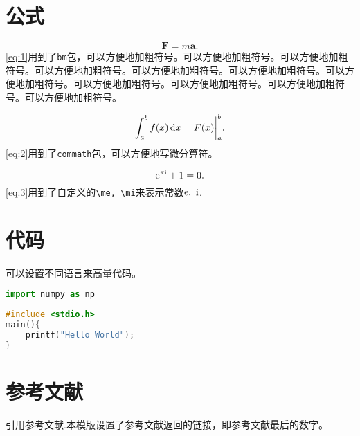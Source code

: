 \section{公式}


\begin{equation}
    \bm{F} = m\bm{a}.
    \label{eq:1}
\end{equation}
\cref{eq:1}用到了\texttt{bm}包，可以方便地加粗符号。可以方便地加粗符号。可以方便地加粗符号。可以方便地加粗符号。可以方便地加粗符号。可以方便地加粗符号。可以方便地加粗符号。可以方便地加粗符号。可以方便地加粗符号。可以方便地加粗符号。可以方便地加粗符号。

\begin{equation}
    \int^b_a f(x) \dif x=F(x)\bigg|^b_a.
    \label{eq:2}
\end{equation}
\cref{eq:2}用到了\texttt{commath}包，可以方便地写微分算符。

\begin{equation}
    \mathrm{e} ^{\pi \mathrm{i}} + 1 = 0.
    \label{eq:3}
\end{equation}
\cref{eq:3}用到了自定义的\verb"\me, \mi"来表示常数$\mathrm{e},\ \mathrm{i}$.

\section{代码}

可以设置不同语言来高量代码。

\begin{lstlisting}[language=python]
import numpy as np
\end{lstlisting}

\begin{lstlisting}[language=c]
#include <stdio.h>
main(){
    printf("Hello World");
}
\end{lstlisting}

\section{参考文献}

引用参考文献.本模版设置了参考文献返回的链接，即参考文献最后的数字。

